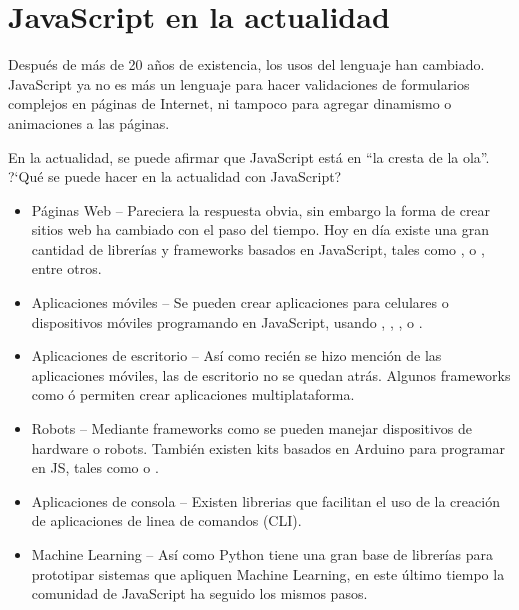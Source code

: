 \section{JavaScript en la actualidad}

Después de más de 20 años de existencia, los usos del lenguaje han cambiado. JavaScript ya no es más un lenguaje para hacer validaciones de formularios complejos en páginas de Internet, ni tampoco para agregar dinamismo o animaciones a las páginas.

En la actualidad, se puede afirmar que JavaScript está en "`la cresta de la ola"'. ?`Qué se puede hacer en la actualidad con JavaScript?

\begin{itemize}
	\item Páginas Web -- Pareciera la respuesta obvia, sin embargo la forma de crear sitios web ha cambiado con el paso del tiempo. Hoy en día existe una gran cantidad de librerías y frameworks basados en JavaScript, tales como ,  o , entre otros.
	\item Aplicaciones móviles -- Se pueden crear aplicaciones para celulares o dispositivos móviles programando en JavaScript, usando , , ,  o .
	\item Aplicaciones de escritorio -- Así como recién se hizo mención de las aplicaciones móviles, las de escritorio no se quedan atrás. Algunos frameworks como  ó  permiten crear aplicaciones multiplataforma.
	\item Robots -- Mediante frameworks como  se pueden manejar dispositivos de hardware o robots. También existen kits basados en Arduino para programar en JS, tales como  o .
	\item Aplicaciones de consola -- Existen librerias que facilitan el uso de la creación de aplicaciones de linea de comandos (CLI).
	\item Machine Learning -- Así como Python tiene una gran base de librerías para prototipar sistemas que apliquen Machine Learning, en este último tiempo la comunidad de JavaScript ha seguido los mismos pasos.
\end{itemize}
